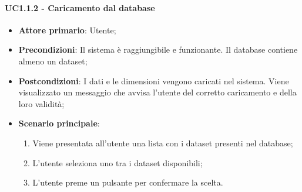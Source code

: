 \paragraph{UC1.1.2 - Caricamento dal database}
\begin{itemize}
	\item \textbf{Attore primario}: Utente;
	\item \textbf{Precondizioni}: Il sistema è raggiungibile e funzionante. Il database contiene almeno un dataset;
	\item \textbf{Postcondizioni}: I dati e le dimensioni vengono caricati nel sistema. Viene visualizzato un messaggio che avvisa l'utente del corretto caricamento e della loro validità;
	\item \textbf{Scenario principale}: 
	\begin{enumerate}
			\item Viene presentata all'utente una lista con i dataset presenti nel database;
			\item L'utente seleziona uno tra i dataset disponibili;
			\item L'utente preme un pulsante per confermare la scelta.
		\end{enumerate}
	
\end{itemize}